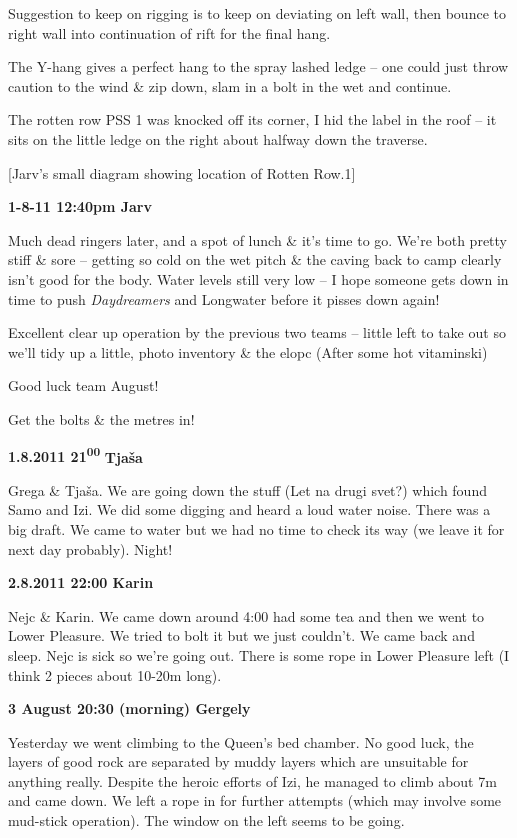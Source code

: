 Suggestion to keep on rigging is to keep on deviating on left wall, then
bounce to right wall into continuation of rift for the final hang.

The Y-hang gives a perfect hang to the spray lashed ledge -- one could
just throw caution to the wind \& zip down, slam in a bolt in the wet
and continue.

The rotten row PSS 1 was knocked off its corner, I hid the label in the
roof -- it sits on the little ledge on the right about halfway down the
traverse.

{[}Jarv's small diagram showing location of Rotten Row.1{]}

\textbf{1-8-11 12:40pm Jarv}

Much dead ringers later, and a spot of lunch \& it's time to go. We're
both pretty stiff \& sore -- getting so cold on the wet pitch \& the
caving back to camp clearly isn't good for the body. Water levels still
very low -- I hope someone gets down in time to push \emph{Daydreamers}
and Longwater before it pisses down again!

Excellent clear up operation by the previous two teams -- little left to
take out so we'll tidy up a little, photo inventory \& the elopc (After
some hot vitaminski)

Good luck team August!

Get the bolts \& the metres in!

\textbf{1.8.2011 21\textsuperscript{00}} \textbf{Tjaša}

Grega \& Tjaša. We are going down the stuff (Let na drugi svet?) which
found Samo and Izi. We did some digging and heard a loud water noise.
There was a big draft. We came to water but we had no time to check its
way (we leave it for next day probably). Night!

\textbf{2.8.2011 22:00 Karin}

Nejc \& Karin. We came down around 4:00 had some tea and then we went to
Lower Pleasure. We tried to bolt it but we just couldn't. We came back
and sleep. Nejc is sick so we're going out. There is some rope in Lower
Pleasure left (I think 2 pieces about 10-20m long).

\textbf{3 August 20:30 (morning) Gergely}

Yesterday we went climbing to the Queen's bed chamber. No good luck, the
layers of good rock are separated by muddy layers which are unsuitable
for anything really. Despite the heroic efforts of Izi, he managed to
climb about 7m and came down. We left a rope in for further attempts
(which may involve some mud-stick operation). The window on the left
seems to be going.

